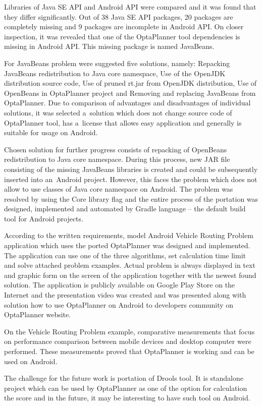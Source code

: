 Libraries of Java SE API and Android API were compared and it was found that they differ significantly. Out of 38 Java
SE API packages, 20 packages are completely missing and 9 packages are incomplete in Android API. On closer inspection,
it was revealed that one of the OptaPlanner tool dependencies is missing in Android API. This missing package is named
JavaBeans.

For JavaBeans problem were suggested five solutions, namely: Repacking JavaBeans redistribution to Java core namespace,
Use of the OpenJDK distribution source code, Use of pruned rt.jar from OpenJDK distribution, Use of OpenBeans in
OptaPlanner project and Removing and replacing JavaBeans from OptaPlanner. Due to comparison of advantages and
disadvantages of individual solutions, it was selected a~solution which does not change source code of OptaPlanner tool,
has a~license that allows easy application and generally is suitable for usage on Android.

Chosen solution for further progress consists of repacking of OpenBeans redistribution to Java core namespace. During
this process, new JAR file consisting of the missing JavaBeans libraries is created and could be subsequently inserted
into an~Android project. However, this faces the problem which does not allow to use classes of Java core namespace on
Android. The problem was resolved by using the Core library flag and the entire process of the portation was designed,
implemented and automated by Gradle language -- the default build tool for Android projects.

According to the written requirements, model Android Vehicle Routing Problem application which uses the ported
OptaPlanner was designed and implemented. The application can use one of the three algorithms, set calculation time
limit and solve attached problem examples. Actual problem is always displayed in text and graphic form on the screen of
the application together with the newest found solution. The application is publicly available on Google Play Store on
the Internet and the presentation video was created and was presented along with solution how to use OptaPlanner on
Android to developers community on OptaPlanner website.

On the Vehicle Routing Problem example, comparative measurements that focus on performance comparison between mobile
devices and desktop computer were performed. These measurements proved that OptaPlanner is working and can be used on
Android.

The challenge for the future work is portation of Drools tool. It is standalone project which can be used by OptaPlanner
as one of the option for calculation the score and in the future, it may be interesting to have such tool on Android.
